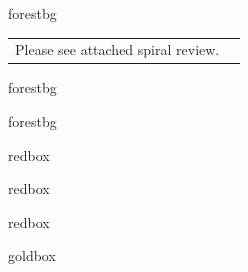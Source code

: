 \documentclass[10pt]{article}
\begin{document}
\begin{fixedskillbox}{forestbg}
    \begin{tabularx}{\linewidth}{@{}X c@{}}
        \begin{minipage}[t]{0.55\linewidth}\vspace{0pt}
            Please see attached spiral review.  %
        \end{minipage}
        &
        \begin{minipage}[t]{0.38\linewidth}\vspace{0pt}\centering
        \end{minipage}
    \end{tabularx}
\end{fixedskillbox}

\begin{skillbox}[Hook]{forestbg}
\end{skillbox}

\begin{skillbox}[Lesson]{forestbg}
\end{skillbox}

\begin{skillbox}{redbox}
\end{skillbox}

\begin{skillbox}{redbox}
\end{skillbox}

\begin{skillbox}{redbox}
\end{skillbox}

\begin{skillbox}{goldbox}
\end{skillbox}
\end{document}
